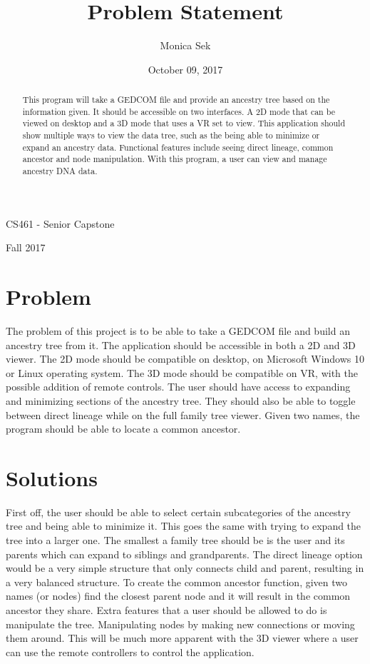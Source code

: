 \documentclass{article}
\title{Problem Statement}
\author{Monica Sek}
\date{October 09, 2017}
\begin{document}
\maketitle

\begin{class}
CS461 - Senior Capstone
\end{class}

\begin{term}
Fall 2017
\end{term}

\begin{abstract}
This program will take a GEDCOM file and provide an ancestry tree based on the information given. It should be accessible on two interfaces. A 2D mode that can be viewed on desktop and a 3D mode that uses a VR set to view. This application should show multiple ways to view the data tree, such as the being able to minimize or expand an ancestry data. Functional features include seeing direct lineage, common ancestor and node manipulation. With this program, a user can view and manage ancestry DNA data.
\end{abstract}

\pagebreak

\section{Problem}
The problem of this project is to be able to take a GEDCOM file and build an ancestry tree from it. The application should be accessible in both a 2D and 3D viewer. The 2D mode should be compatible on desktop, on Microsoft Windows 10 or Linux operating system. The 3D mode should be compatible on VR, with the possible addition of remote controls. The user should have access to expanding and minimizing sections of the ancestry tree. They should also be able to toggle between direct lineage while on the full family tree viewer. Given two names, the program should be able to locate a common ancestor.

\section{Solutions}
First off, the user should be able to select certain subcategories of the ancestry tree and being able to minimize it. This goes the same with trying to expand the tree into a larger one. The smallest a family tree should be is the user and its parents which can expand to siblings and grandparents. The direct lineage option would be a very simple structure that only connects child and parent, resulting in a very balanced structure. To create the common ancestor function, given two names (or nodes) find the closest parent node and it will result in the common ancestor they share. 
Extra features that a user should be allowed to do is manipulate the tree. Manipulating nodes by making new connections or moving them around. This will be much more apparent with the 3D viewer where a user can use the remote controllers to control the application. 
\end{document}
